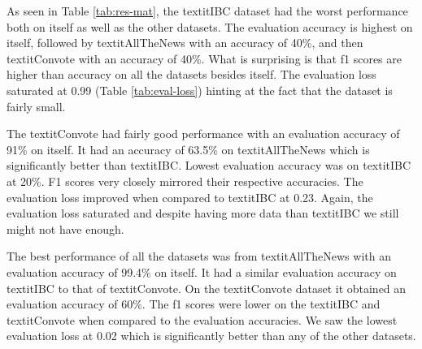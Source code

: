 \documentclass[10pt,a4paper,onecolumn]{article}
\begin{document}
As seen in Table \ref{tab:res-mat}, the textit{IBC} dataset had the worst performance both on itself as well as the other datasets. The evaluation accuracy is highest on itself, followed by textit{AllTheNews} with an accuracy of 40\%, and then textit{Convote} with an accuracy of 40\%. What is surprising is that f1 scores are higher than accuracy on all the datasets besides itself. The evaluation loss saturated at 0.99 (Table \ref{tab:eval-loss}) hinting at the fact that the dataset is fairly small.

The textit{Convote} had fairly good performance with an evaluation accuracy of 91\% on itself. It had an accuracy of 63.5\% on textit{AllTheNews} which is significantly better than textit{IBC}. Lowest evaluation accuracy was on textit{IBC} at 20\%. F1 scores very closely mirrored their respective accuracies. The evaluation loss improved when compared to textit{IBC} at 0.23. Again, the evaluation loss saturated and despite having more data than textit{IBC} we still might not have enough.

The best performance of all the datasets was from textit{AllTheNews} with an evaluation accuracy of 99.4\% on itself. It had a similar evaluation accuracy on textit{IBC} to that of textit{Convote}. On the textit{Convote} dataset it obtained an evaluation accuracy of 60\%. The f1 scores were lower on the textit{IBC} and textit{Convote} when compared to the evaluation accuracies. We saw the lowest evaluation loss at 0.02 which is significantly better than any of the other datasets.
\end{document}
